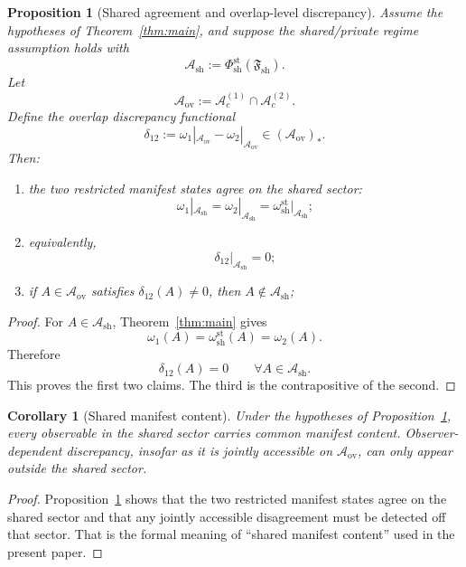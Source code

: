 \documentclass[12pt]{article}
\newtheorem{proposition}[theorem]{Proposition}
\newtheorem{corollary}[theorem]{Corollary}
\theoremstyle{definition}
\theoremstyle{remark}
\begin{document}
\begin{proposition}[Shared agreement and overlap-level discrepancy]
\label{prop:cpdiscrepancy}
Assume the hypotheses of Theorem~\ref{thm:main}, and suppose the
shared/private regime assumption holds with
\[
\mathcal A_{\mathrm{sh}}
:=
\Phi_{\mathrm{sh}}^{\mathrm{st}}(\mathfrak F_{\mathrm{sh}}).
\]
Let
\[
\mathcal A_{\mathrm{ov}}
:=
\mathcal A_c^{(1)}\cap \mathcal A_c^{(2)}.
\]
Define the overlap discrepancy functional
\[
\delta_{12}
:=
\omega_1|_{\mathcal A_{\mathrm{ov}}}
-
\omega_2|_{\mathcal A_{\mathrm{ov}}}
\in
(\mathcal A_{\mathrm{ov}})_*.
\]
Then:
\begin{enumerate}
\item the two restricted manifest states agree on the shared sector:
  \[
  \omega_1|_{\mathcal A_{\mathrm{sh}}}
  =
  \omega_2|_{\mathcal A_{\mathrm{sh}}}
  =
  \omega_{\mathrm{sh}}^{\mathrm{st}}|_{\mathcal A_{\mathrm{sh}}};
  \]
\item equivalently,
  \[
  \delta_{12}|_{\mathcal A_{\mathrm{sh}}}=0;
  \]
\item if \(A\in\mathcal A_{\mathrm{ov}}\) satisfies
  \(\delta_{12}(A)\neq 0\), then \(A\notin\mathcal A_{\mathrm{sh}}\);
\end{enumerate}
\end{proposition}

\begin{proof}
For \(A\in\mathcal A_{\mathrm{sh}}\), Theorem~\ref{thm:main} gives
\[
\omega_1(A)
=
\omega_{\mathrm{sh}}^{\mathrm{st}}(A)
=
\omega_2(A).
\]
Therefore
\[
\delta_{12}(A)=0
\qquad
\forall A\in\mathcal A_{\mathrm{sh}}.
\]
This proves the first two claims. The third is the contrapositive of the
second.
\end{proof}

\begin{corollary}[Shared manifest content]
\label{cor:sharedcontent}
Under the hypotheses of Proposition~\ref{prop:cpdiscrepancy}, every
observable in the shared sector carries common manifest content.
Observer-dependent discrepancy, insofar as it is jointly accessible on
\(\mathcal A_{\mathrm{ov}}\), can only appear outside the shared
sector.
\end{corollary}

\begin{proof}
Proposition~\ref{prop:cpdiscrepancy} shows that the two restricted
manifest states agree on the shared sector and that any jointly
accessible disagreement must be detected off that sector. That is the
formal meaning of ``shared manifest content'' used in the present paper.
\end{proof}
\end{document}
